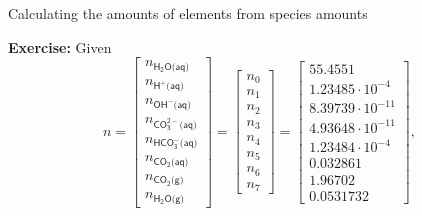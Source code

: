 %
%
\begin{frame}{Calculating the amounts of elements from species amounts}

\vskip 10pt
\lcol[0.7]

\alert{\textbf{Exercise:}} Given 
\[
n=\left[\begin{array}{l}
n_{\mathsf{H_{2}O\text{(}aq\text{)}}}\\
n_{\mathsf{H^{+}\text{(}aq\text{)}}}\\
n_{\mathsf{OH^{-}\text{(}aq\text{)}}}\\
n_{\mathsf{CO_{3}^{2-}\text{(}aq\text{)}}}\\
n_{\mathsf{HCO_{3}^{-}\text{(}aq\text{)}}}\\
n_{\mathsf{CO_{2}\text{(}aq\text{)}}}\\
n_{\mathsf{CO_{2}\text{(}g\text{)}}}\\
n_{\mathsf{H_{2}O\text{(}g\text{)}}}
\end{array}\right]=\begin{bmatrix}n_{0}\\
n_{1}\\
n_{2}\\
n_{3}\\
n_{4}\\
n_{5}\\
n_{6}\\
n_{7}
\end{bmatrix}=\begin{bmatrix}55.4551\\
1.23485\cdot10^{-4}\\
8.39739\cdot10^{-11}\\
4.93648\cdot10^{-11}\\
1.23484\cdot10^{-4}\\
0.032861\\
1.96702\\
0.0531732
\end{bmatrix},
\]


\end{frame}
